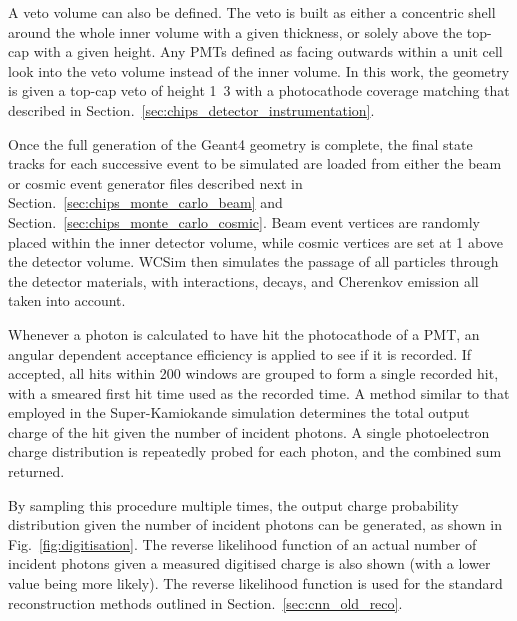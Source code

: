 A veto volume can also be defined. The veto is built as either a concentric shell around the whole
inner volume with a given thickness, or solely above the top-cap with a given height. Any PMTs
defined as facing outwards within a unit cell look into the veto volume instead of the inner
volume. In this work, the \chipsfive geometry is given a top-cap veto of height
\unit{1.3}{} with a photocathode coverage matching that described in
Section.~\ref{sec:chips_detector_instrumentation}.

Once the full generation of the Geant4 geometry is complete, the final state tracks for each
successive event to be simulated are loaded from either the beam or cosmic event generator files
described next in Section.~\ref{sec:chips_monte_carlo_beam} and
Section.~\ref{sec:chips_monte_carlo_cosmic}. Beam event vertices are randomly placed within the
inner detector volume, while cosmic vertices are set at \unit{1}{} above the detector
volume. WCSim then simulates the passage of all particles through the detector materials, with
interactions, decays, and Cherenkov emission all taken into account.

Whenever a photon is calculated to have hit the photocathode of a PMT, an angular dependent
acceptance efficiency is applied to see if it is recorded. If accepted, all hits within
\unit{200}{} windows are grouped to form a single recorded hit, with a smeared first hit
time used as the recorded time. A method similar to that employed in the Super-Kamiokande
simulation determines the total output charge of the hit given the number of incident photons. A
single photoelectron charge distribution is repeatedly probed for each photon, and the combined
sum returned.

By sampling this procedure multiple times, the output charge probability distribution given the
number of incident photons can be generated, as shown in Fig.~\ref{fig:digitisation}. The reverse
likelihood function of an actual number of incident photons given a measured digitised charge is
also shown (with a lower value being more likely). The reverse likelihood function is used for the
standard reconstruction methods outlined in Section.~\ref{sec:cnn_old_reco}.

